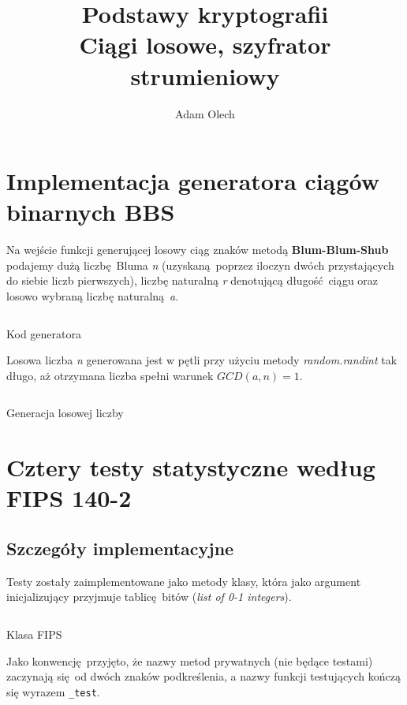 \documentclass[12pt]{article}
\title{Podstawy kryptografii \\ \large Ciągi losowe, szyfrator strumieniowy}
\author{Adam Olech}
\begin{document}
\maketitle

\tableofcontents
\newpage

\section{Implementacja generatora ciągów binarnych BBS}

Na wejście funkcji generującej losowy ciąg znaków metodą \textbf{Blum-Blum-Shub}
podajemy dużą liczbę Bluma \textit{n} 
(uzyskaną poprzez iloczyn dwóch przystających do siebie liczb pierwszych),
liczbę naturalną \textit{r} denotującą długość ciągu
oraz losowo wybraną liczbę naturalną \textit{a}.

\begin{listing}[H]
	\inputminted[firstline=21,lastline=32]{python}{../bbs_generator.py}
	\caption{Kod generatora}
\end{listing}

Losowa liczba \textit{n} generowana jest w pętli przy użyciu metody \textit{random.randint}
tak długo, aż otrzymana liczba spełni warunek $GCD(a,n) = 1$.

\begin{listing}[H]
	\inputminted[firstline=14,lastline=19]{python}{../bbs_generator.py}
	\caption{Generacja losowej liczby}
\end{listing}

\newpage

\section{Cztery testy statystyczne według FIPS 140-2}

\subsection{Szczegóły implementacyjne}

Testy zostały zaimplementowane jako metody klasy, która jako argument inicjalizujący przyjmuje
tablicę bitów (\textit{list of 0-1 integers}).

\begin{listing}[H]
	\inputminted[firstline=4,lastline=9]{python}{../fips.py}
	\caption{Klasa FIPS}
\end{listing}

Jako konwencję przyjęto, że nazwy metod prywatnych (nie będące testami) zaczynają się od dwóch znaków podkreślenia,
a nazwy funkcji testujących kończą się wyrazem \lstinline{_test}.
\end{document}
